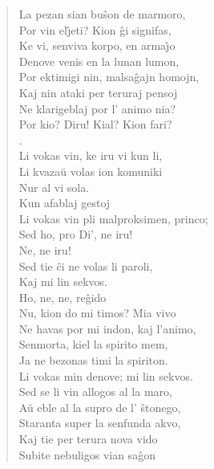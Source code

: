 \begin{verse}
                La pezan sian bu\^son de marmoro,\\
                Por vin el\^{\j}eti? Kion \^gi signifas,\\
                Ke vi, senviva korpo, en arma\^{\j}o\\
                Denove venis en la lunan lumon,\\
                Por ektimigi nin, malsa\^gajn homojn,\\
                Kaj nin ataki per teruraj pensoj\\
                Ne klarigeblaj por l' animo nia?\\
                Por kio? Diru! Kial? Kion fari?\\
.\\
 Li vokas vin, ke iru vi kun li,\\
                Li kvaza\u u volas ion komuniki\\
                Nur al vi sola.\\
 Kun afablaj gestoj\\
                Li vokas vin pli malproksimen, princo;\\
                Sed ho, pro Di', ne iru!\\
 Ne, ne iru!\\
 Sed tie \^ci ne volas li paroli,\\
                Kaj mi lin sekvos.\\
 Ho, ne, ne, re\^gido\\
 Nu, kion do mi timos? Mia vivo\\
                Ne havas por mi indon, kaj l'animo,\\
                Senmorta, kiel la spirito mem,\\
                Ja ne bezonas timi la spiriton.\\
                Li vokas min denove; mi lin sekvos.\\
 Sed se li vin allogos al la maro,\\
                A\u u eble al la supro de l' \^stonego,\\
                Staranta super la senfunda akvo,\\
                Kaj tie per terura nova vido\\
                Subite nebuligos vian sa\^gon\\

\end{verse}
